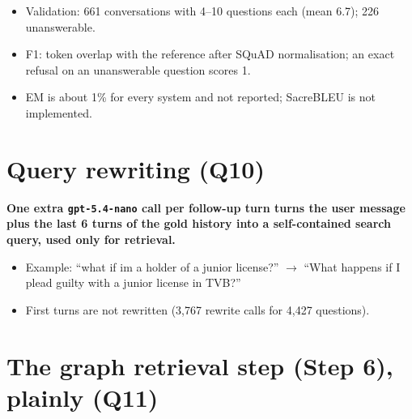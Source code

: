 \documentclass[11pt,a4paper]{article}
\newcommand{\gen}{\texttt{gpt-5.4-nano}}
\begin{document}
\begin{itemize}
\item Validation: 661 conversations with 4--10 questions each (mean 6.7); 226 unanswerable.
\item F1: token overlap with the reference after SQuAD normalisation; an exact refusal on an
  unanswerable question scores 1.
\item EM is about 1\% for every system and not reported; SacreBLEU is not implemented.
\end{itemize}

\section{Query rewriting (Q10)}\label{sec:rewrite}

\textbf{One extra \gen{} call per follow-up turn turns the user message plus the last 6 turns
of the gold history into a self-contained search query, used only for retrieval.}

\begin{center}
\end{center}

\begin{itemize}
\item Example: ``what if im a holder of a junior license?'' $\to$ ``What happens if I plead guilty
  with a junior license in TVB?''
\item First turns are not rewritten (3,767 rewrite calls for 4,427 questions).
\end{itemize}

\section{The graph retrieval step (Step 6), plainly (Q11)}\label{sec:step6}
\end{document}
